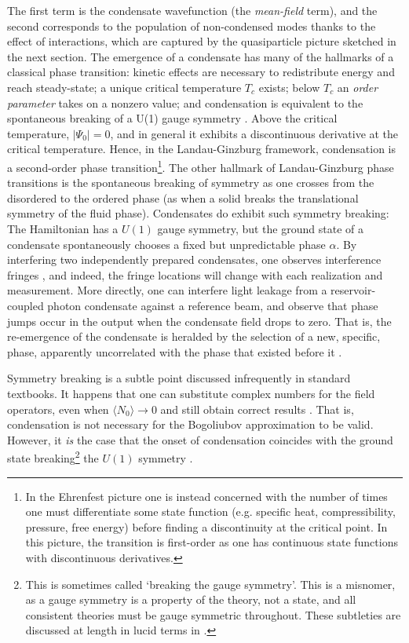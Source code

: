 	The first term is the condensate wavefunction (the \emph{mean-field} term), and the second corresponds to the population of non-condensed modes thanks to the effect of interactions, which are captured by the quasiparticle picture sketched in the next section.	The emergence of a condensate has many of the hallmarks of a classical phase transition: kinetic effects are necessary to redistribute energy and reach steady-state; a unique critical temperature $T_c$ exists; below $T_c$ an \emph{order parameter} takes on a nonzero value; and condensation is equivalent to the spontaneous breaking of a U(1) gauge symmetry \cite{Yukalov11_symmetry}.
	Above the critical temperature, $|\Psi_0|=0$, and in general it exhibits a discontinuous derivative at the critical temperature.
	Hence, in the Landau-Ginzburg framework, condensation is a second-order phase transition\footnote{In the Ehrenfest picture one is instead concerned with the number of times one must differentiate some state function (e.g.
	specific heat, compressibility, pressure, free energy) before finding a discontinuity at the critical point.
	In this picture, the transition is first-order as one has continuous state functions with discontinuous derivatives.}.
	The other hallmark of Landau-Ginzburg phase transitions is the spontaneous breaking of symmetry as one crosses from the disordered to the ordered phase (as when a solid breaks the translational symmetry of the fluid phase).
	Condensates do exhibit such symmetry breaking: The Hamiltonian has a $U(1)$ gauge symmetry, but the ground state of a condensate spontaneously chooses a fixed but unpredictable phase $\alpha$.
	By interfering two independently prepared condensates, one observes interference fringes \cite{Andrews97}, and indeed, the fringe locations will change with each realization and measurement.
	More directly, one can interfere light leakage from a reservoir-coupled photon condensate against a reference beam, and observe that phase jumps occur in the output when the condensate field drops to zero.
	That is, the re-emergence of the condensate is heralded by the selection of a new, specific, phase, apparently uncorrelated with the phase that existed before it \cite{Schmitt16}.
	
	
	Symmetry breaking is a subtle point discussed infrequently in standard textbooks.
	It happens that one can substitute complex numbers for the field operators,  even when $\langle N_0\rangle \rightarrow 0$ and still obtain correct results \cite{Ginibre67}.
	That is, condensation is not necessary for the Bogoliubov approximation to be valid.
	However, it \emph{is} the case that the onset of condensation coincides with the ground state breaking\footnote{This is sometimes called `breaking the gauge symmetry'.
	This is a misnomer, as a gauge symmetry is a property of the theory, not a state, and all consistent theories must be gauge symmetric throughout.
	These subtleties are discussed at length in lucid terms in \cite{Poniatowski19}.} the $U(1)$ symmetry \cite{Suto05}.
	
